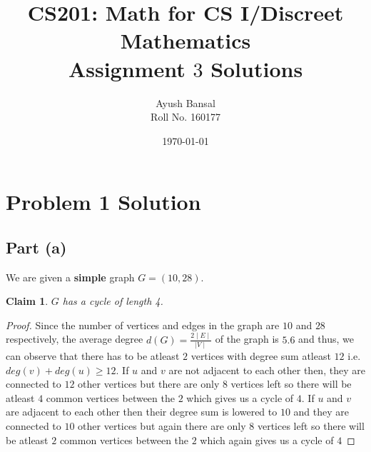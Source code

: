 \documentclass{article}
\title{\vspace{80mm}\lightgreyb CS201: Math for CS I/Discreet Mathematics \\
\lightgreyb Assignment $3$ Solutions}
\author{Ayush Bansal \\
Roll No. 160177}
\date{\today}
\let\bold\textbf
\newtheorem{claim}{Claim}[subsection]
\begin{document}
\clearpage\maketitle
\thispagestyle{empty}
\newpage
\setcounter{page}{1}
\section{Problem 1 Solution}{
  \subsection{Part (a)}{
    We are given a \bold{simple} graph $G=(10,28)$.
    \begin{claim}
      $G$ has a cycle of length 4.
    \end{claim}
    \begin{proof}
      Since the number of vertices and edges in the graph are $10$ and $28$ respectively, the average degree $d(G)=\frac{2\mid E\mid}{\mid V\mid}$ of the graph is $5.6$ and thus, we can observe that there has to be atleast $2$ vertices with degree sum atleast $12$ i.e. $deg(v)+deg(u) \geq 12$. \newline
      If $u$ and $v$ are not adjacent to each other then, they are connected to $12$ other vertices but there are only $8$ vertices left so there will be atleast $4$ common vertices between the $2$ which gives us a cycle of $4$. \newline
      If $u$ and $v$ are adjacent to each other then their degree sum is lowered to $10$ and they are connected to $10$ other vertices but again there are only $8$ vertices left so there will be atleast $2$ common vertices between the $2$ which again gives us a cycle of $4$
    \end{proof}
  }
}
\end{document}
